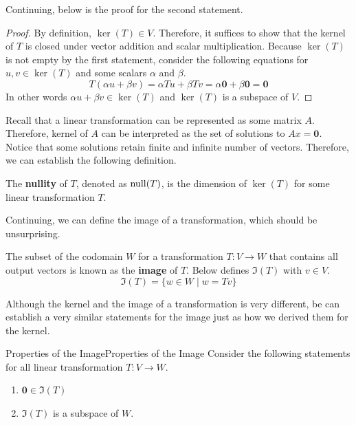 \documentclass[../main.tex]{subfiles}
\begin{document}
Continuing, below is the proof for the second statement.

\begin{proof}
By definition, $\ker(T) \in V$. Therefore, it suffices to show that
the kernel of $T$ is closed under vector addition and scalar
multiplication. Because $\ker(T)$ is not empty by the first statement,
consider the following equations for $u, v \in \ker(T)$ and some
scalars $\alpha$ and $\beta$.
\[
T(\alpha u + \beta v)
= \alpha Tu + \beta Tv
= \alpha \mathbf{0} + \beta \mathbf{0}
= \mathbf{0}
\]
In other words $\alpha u + \beta v \in \ker(T)$ and $\ker(T)$ is a
subspace of $V$.
\end{proof}

Recall that a linear transformation can be represented as some
matrix $A$. Therefore, kernel of $A$ can be interpreted as the
set of solutions to $Ax = \mathbf{0}$. Notice that some solutions
retain finite and infinite number of vectors. Therefore, we can
establish the following definition.

\begin{definition}
The \textbf{nullity} of $T$, denoted as $\operatorname{null}(T)$, is the dimension
of $\ker(T)$ for some linear transformation $T$.
\end{definition}

Continuing, we can define the image of a transformation, which should
be unsurprising.

\begin{definition}
The subset of the codomain $W$ for a transformation $T: V \to W$ that
contains all output vectors is known as the \textbf{image} of $T$.
Below defines $\Im(T)$ with $v \in V$.
\vspace{-0.8\baselineskip}
\[
\Im(T)
= \{ w \in W \mid w = Tv \}
\]
\end{definition}

Although the kernel and the image of a transformation is very
different, be can establish a very similar statements for the image
just as how we derived them for the kernel.

\begin{theorem}{Properties of the Image}{Properties of the Image}
Consider the following statements for all linear transformation
$T: V \to W$.
\begin{enumerate}[noitemsep]
\item $\mathbf{0} \in \Im(T)$
\item $\Im(T)$ is a subspace of $W$.
\end{enumerate}
\end{theorem}
\end{document}
